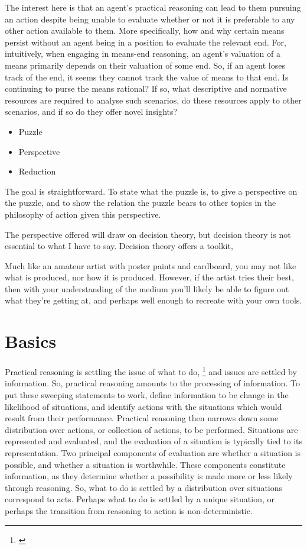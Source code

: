 \documentclass[10pt]{article}
\begin{document}
The interest here is that an agent's practical reasoning can lead to them pursuing an action despite being unable to evaluate whether or not it is preferable to any other action available to them.
More specifically, how and why certain means persist without an agent being in a position to evaluate the relevant end.
For, intuitively, when engaging in means-end reasoning, an agent's valuation of a means primarily depends on their valuation of some end.
So, if an agent loses track of the end, it seems they cannot track the value of means to that end.
Is continuing to purse the means rational?
If so, what descriptive and normative resources are required to analyse such scenarios, do these resources apply to other scenarios, and if so do they offer novel insights?

\begin{itemize}
\item Puzzle
\item Perspective
\item Reduction
\end{itemize}


{\color{red} }

The goal is straightforward.
To state what the puzzle is, to give a perspective on the puzzle, and to show the relation the puzzle bears to other topics in the philosophy of action given this perspective.

The perspective offered will draw on decision theory, but decision theory is not essential to what I have to say.
Decision theory offers a toolkit,

Much like an amateur artist with poster paints and cardboard, you may not like what is produced, nor how it is produced.
However, if the artist tries their best, then with your understanding of the medium you'll likely be able to figure out what they're getting at, and perhaps well enough to recreate with your own tools.

\newpage

\section{Basics}
\label{sec:basics}


Practical reasoning is settling the issue of what to do,\nolinebreak
\footnote{\textcite[216]{Audi:1993aa}}
and issues are settled by information.
So, practical reasoning amounts to the processing of information.
To put these sweeping statements to work, define information to be change in the likelihood of situations, and identify actions with the situations which would result from their performance.
Practical reasoning then narrows down some distribution over actions, or collection of actions, to be performed.
Situations are represented and evaluated, and the evaluation of a situation is typically tied to its representation.
Two principal components of evaluation are whether a situation is possible, and whether a situation is worthwhile.
These components constitute information, as they determine whether a possibility is made more or less likely through reasoning.
So, what to do is settled by a distribution over situations correspond to acts.
Perhaps what to do is settled by a unique situation, or perhaps the transition from reasoning to action is non-deterministic.
\end{document}
